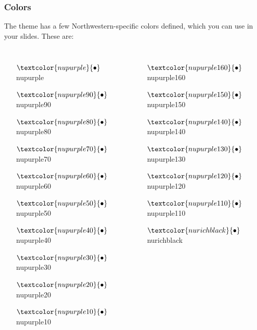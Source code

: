 \documentclass[aspectratio=1610]{beamer}
\begin{document}
\begin{frame}
    \frametitle{Colors}
    The theme has a few Northwestern-specific colors defined, which you can use in your slides. These are:
    \begin{columns}
    \begin{itemize}
        \item[$\textcolor{nupurple}{\bullet}$] \textcolor{nupurple}{nupurple} 
        \item[$\textcolor{nupurple90}{\bullet}$] \textcolor{nupurple90}{nupurple90} 
        \item[$\textcolor{nupurple80}{\bullet}$] \textcolor{nupurple80}{nupurple80}
        \item[$\textcolor{nupurple70}{\bullet}$] \textcolor{nupurple70}{nupurple70}
        \item[$\textcolor{nupurple60}{\bullet}$] \textcolor{nupurple60}{nupurple60}
        \item[$\textcolor{nupurple50}{\bullet}$] \textcolor{nupurple50}{nupurple50}
        \item[$\textcolor{nupurple40}{\bullet}$] \textcolor{nupurple40}{nupurple40}
        \item[$\textcolor{nupurple30}{\bullet}$] \textcolor{nupurple30}{nupurple30}
        \item[$\textcolor{nupurple20}{\bullet}$] \textcolor{nupurple20}{nupurple20}
        \item[$\textcolor{nupurple10}{\bullet}$] \textcolor{nupurple10}{nupurple10}
    \end{itemize}
    \begin{itemize}
        \item[$\textcolor{nupurple160}{\bullet}$] \textcolor{nupurple160}{nupurple160}
        \item[$\textcolor{nupurple150}{\bullet}$] \textcolor{nupurple150}{nupurple150}
        \item[$\textcolor{nupurple140}{\bullet}$] \textcolor{nupurple140}{nupurple140}
        \item[$\textcolor{nupurple130}{\bullet}$] \textcolor{nupurple130}{nupurple130}
        \item[$\textcolor{nupurple120}{\bullet}$] \textcolor{nupurple120}{nupurple120}
        \item[$\textcolor{nupurple110}{\bullet}$] \textcolor{nupurple110}{nupurple110}
        \item[$\textcolor{nurichblack}{\bullet}$] \textcolor{nurichblack}{nurichblack}

\end{itemize}
\end{columns}
\end{frame}
\end{document}
